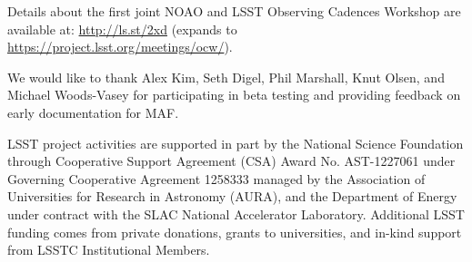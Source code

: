 \documentclass[]{spie}  %
\begin{document}
Details about the first joint NOAO and LSST Observing Cadences
Workshop are available at:
{\url {http://ls.st/2xd}}
(expands to 
{\url {https://project.lsst.org/meetings/ocw/}}). 


\acknowledgments     %

We would like to thank Alex Kim, Seth Digel, Phil Marshall, Knut Olsen, and Michael Woods-Vasey for participating in beta testing and providing feedback on early documentation for MAF. 

LSST project activities are supported in part by the National Science Foundation through Cooperative Support Agreement (CSA) Award No. AST-1227061 under Governing Cooperative Agreement 1258333 managed by the Association of Universities for Research in Astronomy (AURA), and the Department of Energy under contract with the SLAC National Accelerator Laboratory.   Additional LSST funding comes from private donations, grants to universities, and in-kind support from LSSTC Institutional Members.



\end{document}
